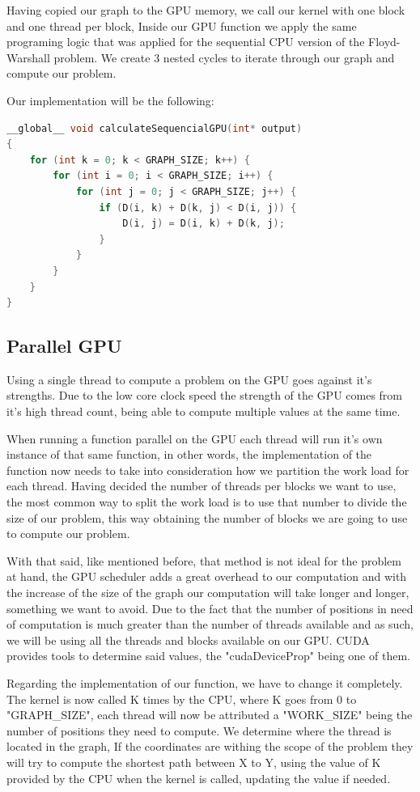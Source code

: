 \documentclass[conference]{IEEEtran}
\begin{document}
Having copied our graph to the GPU memory, we call our kernel with one block and one thread per block, 
Inside our GPU function we apply the same programing logic that was applied for the sequential CPU version of the Floyd-Warshall problem. 
We create 3 nested cycles to iterate through our graph and compute our problem.

Our implementation will be the following:
\begin{lstlisting}[language=C++, caption=Sequential CUDA]
	__global__ void calculateSequencialGPU(int* output)
{
	for (int k = 0; k < GRAPH_SIZE; k++) {
		for (int i = 0; i < GRAPH_SIZE; i++) {
			for (int j = 0; j < GRAPH_SIZE; j++) {
				if (D(i, k) + D(k, j) < D(i, j)) {
					D(i, j) = D(i, k) + D(k, j);
				}
			}
		}
	}
}
\end{lstlisting}


\subsection{Parallel GPU}
Using a single thread to compute a problem on the GPU goes against it's strengths. 
Due to the low core clock speed the strength of the GPU comes from it's high thread count, being able to compute multiple values at the same time. 

When running a function parallel on the GPU each thread will run it's own instance of that same function, in other words, the implementation of the function now needs to take into consideration how we partition the work load for each thread. 
Having decided the number of threads per blocks we want to use, the most common way to split the work load is to use that number to divide the size of our problem, this way obtaining the number of blocks we are going to use to compute our problem. 

With that said, like mentioned before, that method is not ideal for the problem at hand, the GPU scheduler adds a great overhead to our computation and with the increase of the size of the graph our computation will take longer and longer, something we want to avoid. Due to the fact that the number of positions in need of computation is much greater than the number of threads available and as such, we will be using all the threads and blocks available on our GPU. 
CUDA provides tools to determine said values, the "cudaDeviceProp" being one of them.

Regarding the implementation of our function, we have to change it completely.
The kernel is now called K times by the CPU, where K goes from 0 to "GRAPH\_SIZE", 
each thread will now be attributed a "WORK\_SIZE" being the number of positions they need to compute. 
We determine where the thread is located in the graph,
If the coordinates are withing the scope of the problem they will try to compute the shortest path between X to Y, using the value of K provided by the CPU when the kernel is called, updating the value if needed. 
\end{document}
